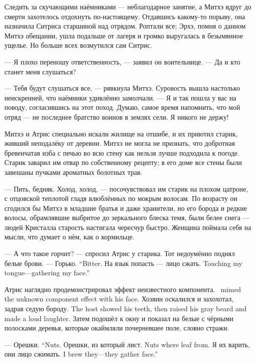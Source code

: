 Следить за скучающими наёмниками --- неблагодарное занятие, а Митхэ вдруг до смерти захотелось отдохнуть по-настоящему.
Отдавшись какому-то порыву, она назначила Ситриса старшиной над отрядом.
Роптали все;
Эрхэ, помня о данном Митхэ обещании, ушла подальше от лагеря и громко выругалась в безымянное ущелье.
Но больше всех возмутился сам Ситрис.

--- Я плохо переношу ответственность, --- заявил он воительнице.
--- Да и кто станет меня слушаться?

--- Тебя будут слушаться все, --- рявкнула Митхэ.
Суровость вышла настолько неискренней, что наёмники удивлённо замолчали.
--- Я и так пошла у вас на поводу, согласившись на этот поход.
Думаю, самое время напомнить, что мой отряд --- не последнее братство воинов в землях сели.
Я никого не держу!

Митхэ и Атрис специально искали жилище на отшибе, и их приютил старик, живший неподалёку от деревни.
Митхэ не могла не признать, что добротная бревенчатая изба с печью во всю стену как нельзя лучше подходила к погоде.
Старик заварил им отвар по собственному рецепту;
в его доме все стены были завешаны пучками ароматных болотных трав.

--- Пить, бедняк.
Холод, холод, --- посочувствовал им старик на плохом цатроне, с отцовской теплотой гладя влюблённых по мокрым волосам.
По возрасту он сгодился бы Митхэ в младшие братья и даже хранители, но его борода и редкие волосы, обрамлявшие выбритое до зеркального блеска темя, были белее снега --- людей Кристалла старость настигала чересчур быстро.
Женщина поймала себя на мысли, что думает о нём, как о кормильце.

--- А что такое горчит? --- спросил Атрис у старика.
Тот недоумённо поднял белые брови.
{--- Горько.}
{``Bitter.}
{На язык попасть --- лицо сжать.}
{Touching my tongue---gathering my face.''}

{Атрис наглядно продемонстрировал эффект неизвестного компонента.}
{\Aatris\ mimed the unknown component effect with his face.}
{Хозяин оскалился и захохотал, задрав седую бороду.}
{The host showed his teeth, then raised his gray beard and made a loud laughter.}
Затем подошёл к окну и показал на белые с чёрными полосками деревья, которые окаймляли почерневшее поле, словно стражи.

{--- Орешки.}
{``Nuts.}
{Орешки, из который лист.}
{Nuts where leaf from.}
{Я их варить, они лицо сжимать.}
{I brew they---they gather face.''}

